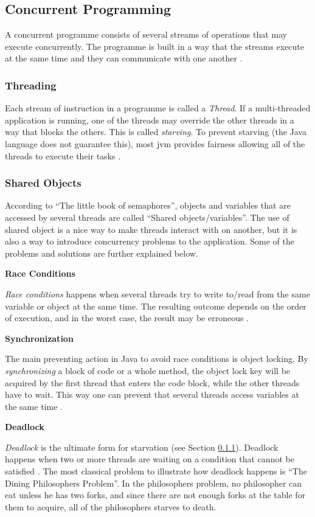 \subsection{Concurrent Programming}
\label{sec:concurrentprog}
A concurrent programme consists of several streams of operations that may execute concurrently. The programme is built in a way that the streams execute at the same time and they can communicate with one another \cite{cartwright2000}.

\subsubsection{Threading}
\label{sec:threading}
Each stream of instruction in a programme is called a \textit{Thread}. If a multi-threaded application is running, one of the threads may override the other threads in a way that blocks the others. This is called \textit{starving}. To prevent starving (the Java language does not guarantee this), most \acrshort{jvm} provides fairness allowing all of the threads to execute their tasks \cite{cartwright2000}.

\subsubsection{Shared Objects}
\label{sec:sharedobj}
According to ``The little book of semaphores''\cite{downey2008}, objects and variables that are accessed by several threads are called ``Shared objects/variables''. The use of shared object is a nice way to make threads interact with on another, but it is also a way to introduce concurrency problems to the application. Some of the problems and solutions are further explained below.

\textbf{Race Conditions}
\label{sec:raisedcond}

\textit{Race conditions} happens when several threads try to write to/read from the same variable or object at the same time. The resulting outcome depends on the order of execution, and in the worst case, the result may be erroneous \cite{stevecarr2003}. 

\textbf{Synchronization}
\label{sec:synchronization}

The main preventing action in Java to avoid race conditions is object locking. By \textit{synchronizing} a block of code or a whole method, the object lock key will be acquired by the first thread that enters the code block, while the other threads have to wait. This way one can prevent that several threads access variables at the same time \cite{cartwright2000}.

\textbf{Deadlock}
\label{sec:deadlock}

\textit{Deadlock} is the ultimate form for starvation (see Section \ref{sec:threading}). Deadlock happens when two or more threads are waiting on a condition that cannot be satisfied \cite{sunmicrosystems2005}. The most classical problem to illustrate how deadlock happens is ``The Dining Philosophers Problem''\cite{cartwright2000v2}. In the philosophers problem, no philosopher can eat unless he has two forks, and since there are not enough forks at the table for them to acquire, all of the philosophers starves to death.